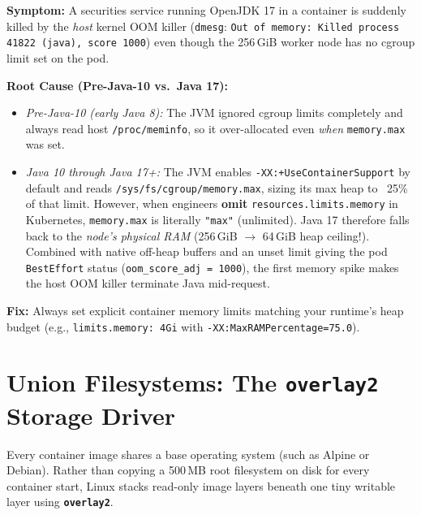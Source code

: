 \begin{realworldbox}
\textbf{Symptom:} A securities service running OpenJDK 17 in a container is suddenly killed by the \emph{host} kernel OOM killer (\texttt{dmesg}: \texttt{Out of memory: Killed process 41822 (java), score 1000}) even though the 256\,GiB worker node has no cgroup limit set on the pod.

\textbf{Root Cause (Pre-Java-10 vs.\ Java 17):}
\begin{itemize}[leftmargin=12pt]
  \item \emph{Pre-Java-10 (early Java 8):} The JVM ignored cgroup limits completely and always read host \texttt{/proc/meminfo}, so it over-allocated even \emph{when} \texttt{memory.max} was set.
  \item \emph{Java 10 through Java 17+:} The JVM enables \texttt{-XX:+UseContainerSupport} by default and reads \texttt{/sys/fs/cgroup/memory.max}, sizing its max heap to ~25\% of that limit. However, when engineers \textbf{omit} \texttt{resources.limits.memory} in Kubernetes, \texttt{memory.max} is literally \texttt{"max"} (unlimited). Java 17 therefore falls back to the \emph{node's physical RAM} (256\,GiB $\to$ 64\,GiB heap ceiling!). Combined with native off-heap buffers and an unset limit giving the pod \texttt{BestEffort} status (\texttt{oom\_score\_adj = 1000}), the first memory spike makes the host OOM killer terminate Java mid-request.
\end{itemize}
\textbf{Fix:} Always set explicit container memory limits matching your runtime's heap budget (e.g., \texttt{limits.memory: 4Gi} with \texttt{-XX:MaxRAMPercentage=75.0}).
\end{realworldbox}

\section{Union Filesystems: The \texttt{overlay2} Storage Driver}

Every container image shares a base operating system (such as Alpine or Debian). Rather than copying a 500\,MB root filesystem on disk for every container start, Linux stacks read-only image layers beneath one tiny writable layer using \textbf{\texttt{overlay2}}.

